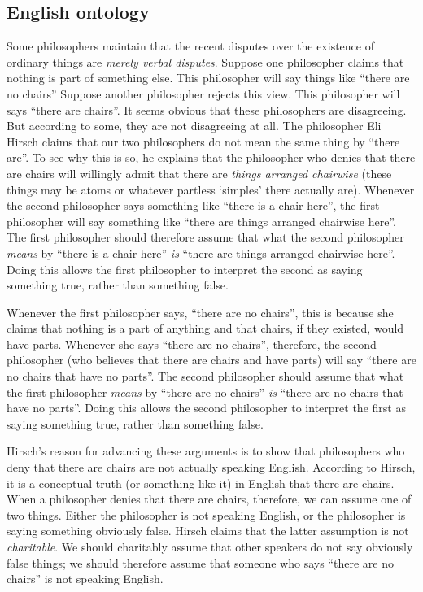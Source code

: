 \documentclass[11pt]{article}
\begin{document}
\begin{spacing}{1.25}
\section{English ontology}
\label{english}
Some philosophers maintain that the recent disputes over the existence
of ordinary things are {\em merely verbal disputes}.  Suppose one
philosopher claims that nothing is part of something else.  This
philosopher will say things like ``there are no chairs'' Suppose
another philosopher rejects this view.  This philosopher will says
``there are chairs''.  It seems obvious that these philosophers are
disagreeing.  But according to some, they are not disagreeing at all.
The philosopher Eli Hirsch claims that our two philosophers do not
mean the same thing by ``there are''.  To see why this is so, he
explains that the philosopher who denies that there are chairs will
willingly admit that there are {\em things arranged chairwise} (these
things may be atoms or whatever partless `simples' there actually
are).  Whenever the second philosopher says something like ``there is
a chair here'', the first philosopher will say something like ``there
are things arranged chairwise here''.  The first philosopher should
therefore assume that what the second philosopher {\em means} by
``there is a chair here'' {\em is} ``there are things arranged
chairwise here''.  Doing this allows the first philosopher to
interpret the second as saying something true, rather than something
false.

Whenever the first philosopher says, ``there are no chairs'', this is
because she claims that nothing is a part of anything and that chairs,
if they existed, would have parts.  Whenever she says ``there are no
chairs'', therefore, the second philosopher (who believes that there
are chairs and have parts) will say ``there are no chairs that have no
parts''.  The second philosopher should assume that what the first
philosopher {\em means} by ``there are no chairs'' {\em is} ``there
are no chairs that have no parts''.  Doing this allows the second
philosopher to interpret the first as saying something true, rather
than something false.

Hirsch's reason for advancing these arguments is to show that
philosophers who deny that there are chairs are not actually speaking
English.  According to Hirsch, it is a conceptual truth (or something
like it) in English that there are chairs.  When a philosopher denies
that there are chairs, therefore, we can assume one of two things.
Either the philosopher is not speaking English, or the philosopher is
saying something obviously false.  Hirsch claims that the latter
assumption is not {\em charitable}.  We should charitably assume that
other speakers do not say obviously false things; we should therefore
assume that someone who says ``there are no chairs'' is not speaking
English.


\end{spacing}
\end{document}
